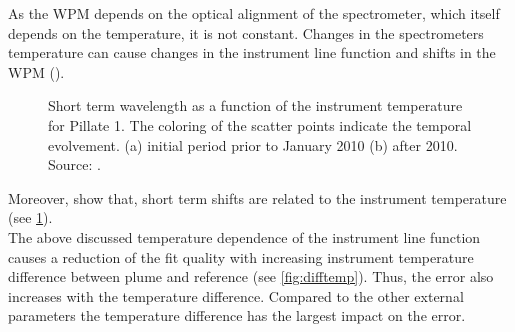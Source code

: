 As the WPM depends on the optical alignment of the spectrometer, which itself depends on the temperature, it is not constant.
Changes in the spectrometers temperature can cause changes in the instrument line function and shifts in the WPM (\citep{pinardi2007influence}). 
\begin{figure}		
	\caption{Short term wavelength as a function of the instrument temperature for Pillate 1. The coloring of the scatter points indicate the temporal evolvement. (a) initial period prior to January 2010 (b) after 2010. Source: \cite{WarnachSimon}.}
	\label{fig:shorttermshift}
\end{figure}
Moreover, \cite{WarnachSimon} show that, short term shifts are related to the instrument temperature (see \cref{fig:shorttermshift}).\\
The above discussed temperature dependence of the instrument line function causes a reduction of the fit quality with increasing instrument temperature difference between plume and reference (see \cref{fig:difftemp}). Thus, the  error also increases with the temperature difference.
Compared to the other external parameters the temperature difference has the largest impact on the  error.\\
\\
